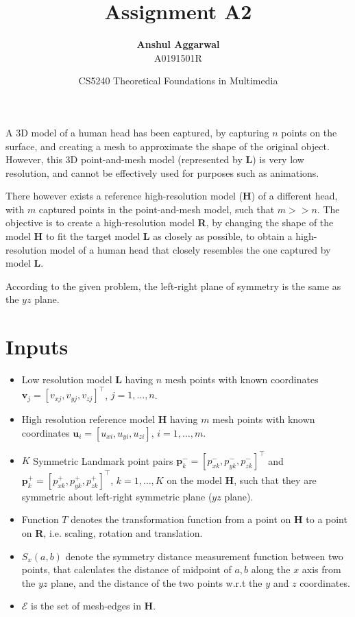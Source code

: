 \documentclass[12pt,a4paper]{article}
\title{Assignment A2}
\author{\textbf{Anshul Aggarwal}\\A0191501R}
\date{CS5240 Theoretical Foundations in Multimedia}
\begin{document}
\maketitle

%

A 3D model of a human head has been captured, by capturing $n$ points on the surface, and creating a mesh to approximate the shape of the original object. However, this 3D point-and-mesh model (represented by \textbf{L}) is very low resolution, and cannot be effectively used for purposes such as animations.

There however exists a reference high-resolution model (\textbf{H}) of a different head, with $m$ captured points in the point-and-mesh model, such that $m >> n$. The objective is to create a high-resolution model \textbf{R}, by changing the shape of the model \textbf{H} to fit the target model \textbf{L} as closely as possible, to obtain a high-resolution model of a human head that closely resembles the one captured by model \textbf{L}.

According to the given problem, the left-right plane of symmetry is the same as the $yz$ plane. 

\section*{Inputs}

\begin{itemize}
    \item \sloppy Low resolution model \textbf{L} having $n$ mesh points with known coordinates $\textbf{v}_j = [v_{xj},v_{yj},v_{zj}]^\top$, $j=1,\dots,n$.
    \item High resolution reference model \textbf{H} having $m$ mesh points with known coordinates $\textbf{u}_i = [u_{xi},u_{yi},u_{zi}]$, $i=1,\dots,m$.
    \item $K$ Symmetric Landmark point pairs $\textbf{p}_k^- = [p_{xk}^-,p_{yk}^-,p_{zk}^-]^\top$ and $\textbf{p}_k^+ = [p_{xk}^+,p_{yk}^+,p_{zk}^+]^\top$, $k=1,\dots,K$ on the model \textbf{H}, such that they are symmetric about left-right symmetric plane ($yz$ plane).
    \item Function $T$ denotes the transformation function from a point on \textbf{H} to a point on \textbf{R}, i.e. scaling, rotation and translation.
    \item $S_x(a,b)$ denote the symmetry distance measurement function between two points, that calculates the distance of midpoint of $a,b$ along the $x$ axis from the $yz$ plane, and the distance of the two points w.r.t the $y$ and $z$ coordinates.
    \item $\mathcal{E}$ is the set of mesh-edges in \textbf{H}.
\end{itemize}
\end{document}
